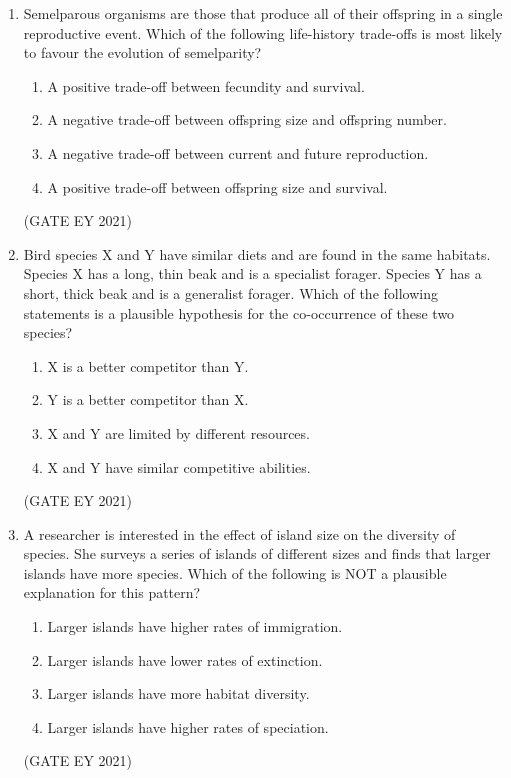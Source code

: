 \documentclass[journal]{IEEEtran}
\begin{document}
\begin{enumerate}
    \item Semelparous organisms are those that produce all of their offspring in a single reproductive event. Which of the following life-history trade-offs is most likely to favour the evolution of semelparity?
    \begin{enumerate}
        \item A positive trade-off between fecundity and survival.
        \item A negative trade-off between offspring size and offspring number.
        \item A negative trade-off between current and future reproduction.
        \item A positive trade-off between offspring size and survival.
    \end{enumerate}
    \hfill{(GATE EY 2021)}

    \item Bird species X and Y have similar diets and are found in the same habitats. Species X has a long, thin beak and is a specialist forager. Species Y has a short, thick beak and is a generalist forager. Which of the following statements is a plausible hypothesis for the co-occurrence of these two species?
    \begin{enumerate}
        \item X is a better competitor than Y.
        \item Y is a better competitor than X.
        \item X and Y are limited by different resources.
        \item X and Y have similar competitive abilities.
    \end{enumerate}
    \hfill{(GATE EY 2021)}
    
    \item A researcher is interested in the effect of island size on the diversity of species. She surveys a series of islands of different sizes and finds that larger islands have more species. Which of the following is NOT a plausible explanation for this pattern?
    \begin{enumerate}
        \item Larger islands have higher rates of immigration.
        \item Larger islands have lower rates of extinction.
        \item Larger islands have more habitat diversity.
        \item Larger islands have higher rates of speciation.
    \end{enumerate}
    \hfill{(GATE EY 2021)}


\end{enumerate}
\end{document}
